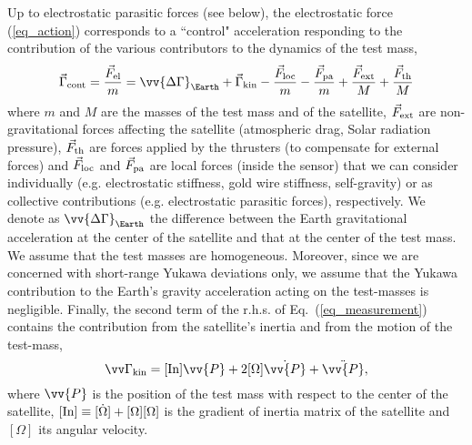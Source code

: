 \documentclass[12pt]{iopart}
\begin{document}
Up to electrostatic parasitic forces (see below), the electrostatic force (\ref{eq_action}) corresponds to a ``control" acceleration responding to the contribution of the various contributors to the dynamics of the test mass,
\begin{equation} \label{eq_measurement}
\vec\Gamma_{\rm cont} = \frac{\vec{F}_{\rm el}}{m} = \vv{\Delta\Gamma}_\Earth + \vec\Gamma_{\rm kin} - \frac{\vec{F}_{\rm loc}}{m} - \frac{\vec{F}_{\rm pa}}{m} + \frac{\vec{F}_{\rm ext}}{M}+ \frac{\vec{F}_{\rm th}}{M}
\end{equation}
where $m$ and $M$ are the masses of the test mass and of the satellite, $\vec{F}_{\rm ext}$ are non-gravitational forces affecting the satellite (atmospheric drag, Solar radiation pressure), $\vec{F}_{\rm th}$ are forces applied by the thrusters (to compensate for external forces) and $\vec{F}_{\rm loc}$ and $\vec{F}_{\rm pa}$ are local forces (inside the sensor) that we can consider individually (e.g. electrostatic stiffness, gold wire stiffness, self-gravity) or as collective contributions (e.g. electrostatic parasitic forces), respectively. We denote as $\vv{\Delta\Gamma}_\Earth$ the difference between the Earth gravitational acceleration at the center of the satellite and that at the center of the test mass.
We assume that the test masses are homogeneous. Moreover, since we are concerned with short-range Yukawa deviations only,  we assume that the Yukawa contribution to the Earth's gravity acceleration acting on the test-masses is negligible. 
Finally, the second term of the r.h.s. of Eq.~(\ref{eq_measurement}) contains the contribution from the satellite's inertia and from the motion of the test-mass,
\begin{equation} \label{eq_kinacc}
\vv\Gamma_{\rm kin} = [{\rm In}] \vv{P} + 2[\Omega] \dot{\vv{P}} + \ddot{\vv{P}},
\end{equation}
where $\vv{P}$ is the position of the test mass with respect to the center of the satellite, $[{\rm In}] \equiv [\dot\Omega] + [\Omega] [\Omega]$ is the gradient of inertia matrix of the satellite and $[\Omega]$ its angular velocity.
\end{document}
